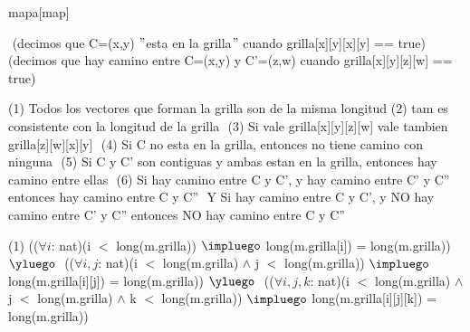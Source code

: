 \begin{Representacion}

\begin{Estructura}{mapa}[map]
	\begin{Tupla}[map]  
  	\end{Tupla}
  	
\end{Estructura}


$ $ $ $\newline
(decimos que C=(x,y) $"$esta en la grilla$"$ cuando grilla[x][y][x][y] == true) $ $\newline
(decimos que hay camino entre C=(x,y) y C'=(z,w) cuando grilla[x][y][z][w] == true) $ $\newline

(1) Todos los vectores que forman la grilla son de la misma longitud$ $\newline
(2) tam es consistente con la longitud de la grilla $ $\newline
(3) Si vale grilla[x][y][z][w] vale tambien grilla[z][w][x][y] $ $\newline
(4) Si C no esta en la grilla, entonces no tiene camino con ninguna $ $\newline
(5) Si C y C' son contiguas y ambas estan en la grilla, entonces hay camino entre ellas $ $\newline
(6) Si hay camino entre C y C', y hay camino entre C' y C'' entonces hay camino entre C y C'' $ $\newline
Y Si hay camino entre C y C', y NO hay camino entre C' y C'' entonces NO hay camino entre C y C'' $ $\newline


(1)
(($\forall i$: nat)(i $<$ long(m.grilla)) $\impluego$ long(m.grilla[i]) = long(m.grilla)) $\yluego$ $ $\newline
(($\forall i, j$: nat)(i $<$ long(m.grilla) $\land$ j $<$ long(m.grilla)) $\impluego$ long(m.grilla[i][j]) = long(m.grilla)) $\yluego$ $ $\newline
(($\forall i, j, k$: nat)(i $<$ long(m.grilla) $\land$ j $<$ long(m.grilla) $\land$ k $<$ long(m.grilla)) $\impluego$ $ $\newline long(m.grilla[i][j][k]) = long(m.grilla))


\end{Representacion}
